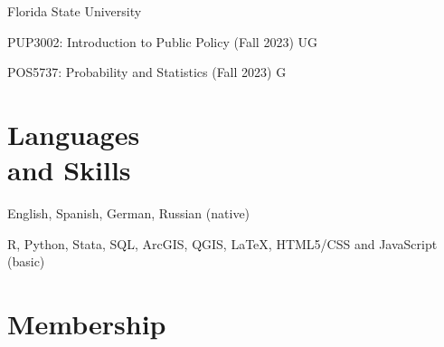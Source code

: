\documentclass[margin,line,10.95pt]{res}
\newenvironment{list1}{
  \begin{list}{\ding{113}}{%
      \setlength{\itemsep}{0in}
      \setlength{\parsep}{0in} \setlength{\parskip}{0in}
      \setlength{\topsep}{0in} \setlength{\partopsep}{0in}
      \setlength{\leftmargin}{0.17in}}}{\end{list}}
\begin{document}
\begin{resume}
{Florida State University}\\
\vspace*{-.1in}
\begin{list1}
\item[] PUP3002: Introduction to Public Policy (Fall 2023) UG
\item[] POS5737: Probability and Statistics (Fall 2023) G
\end{list1}





\section{\sc Languages \\ and Skills}
English, Spanish, German, Russian (native)
\vspace*{-4.5mm}

R, Python, Stata, SQL, ArcGIS, QGIS, \LaTeX , HTML5/CSS and JavaScript (basic) 
\vspace*{-2.5mm}

\section{\sc Membership}


\end{resume}
\end{document}

